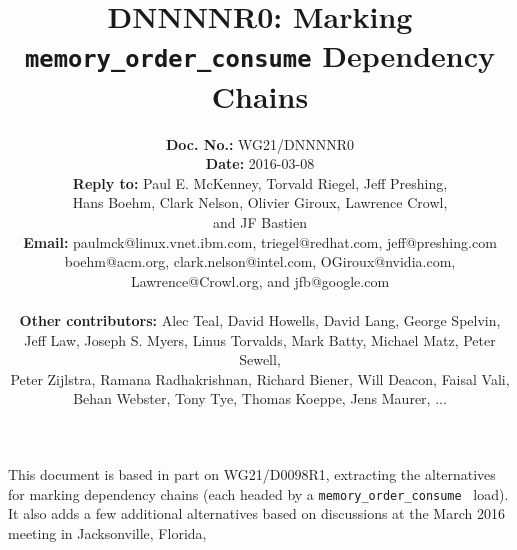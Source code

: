 \documentclass[letterpaper,twocolumn,10pt]{article}
\begin{document}
\newcommand{\co}[1]{\lstinline[breaklines=yes,breakatwhitespace=yes]{#1}}

\title{DNNNNR0: Marking {\tt memory\_order\_consume} Dependency Chains}

\author{
{\bf Doc. No.: } WG21/DNNNNR0 \\
{\bf Date: } 2016-03-08 \\
{\bf Reply to: } Paul E. McKenney, Torvald Riegel, Jeff Preshing, \\
	Hans Boehm, Clark Nelson, Olivier Giroux, Lawrence Crowl, \\
	and JF Bastien \\
{\bf Email: } paulmck@linux.vnet.ibm.com, triegel@redhat.com,
jeff@preshing.com \\
boehm@acm.org, clark.nelson@intel.com, OGiroux@nvidia.com, \\
Lawrence@Crowl.org, and jfb@google.com \\ ~ \\
{\bf Other contributors: }
	Alec Teal,
	David Howells,
	David Lang,
	George Spelvin, \\
	Jeff Law,
	Joseph S. Myers,
	Linus Torvalds,
	Mark Batty,
	Michael Matz,
	Peter Sewell, \\
	Peter Zijlstra,
	Ramana Radhakrishnan,
	Richard Biener,
	Will Deacon,
	Faisal Vali, \\
	Behan Webster,
	Tony Tye,
	Thomas Koeppe,
	Jens Maurer,
	... \\
} %


\pagestyle{myheadings}

\maketitle


This document is based in part on WG21/D0098R1, extracting the
alternatives for marking dependency chains (each headed by a
\co{memory_order_consume}~\cite{RichardSmith2015N4527} load).
It also adds a few additional alternatives based on discussions
at the March 2016 meeting in Jacksonville, Florida,

\end{document}
